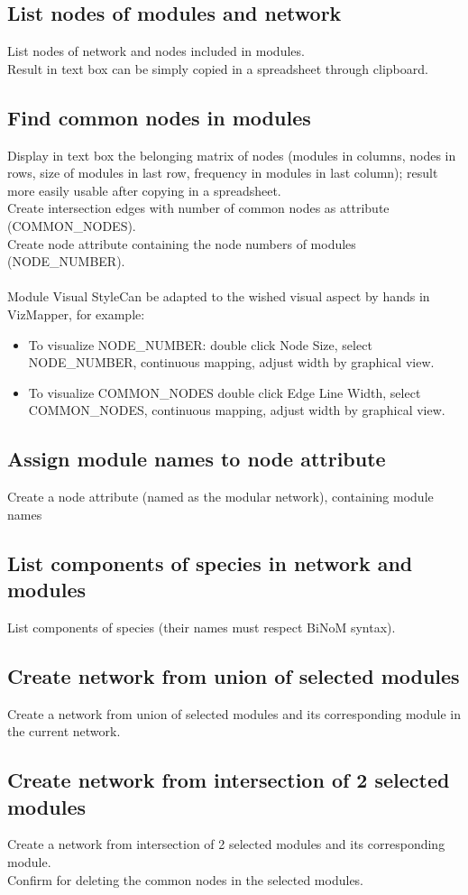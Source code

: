 \subsection{List nodes of modules and network}
List nodes of network and nodes included in modules.\\
Result in text box can be simply copied in a spreadsheet through clipboard.
\subsection{Find common nodes in modules}
Display in text box the belonging matrix of nodes (modules in columns, nodes in rows, size of modules in last row, frequency in modules in last column); result more easily usable after copying in a spreadsheet.\\
Create intersection edges with number of common nodes as attribute (COMMON\_NODES).\\
Create node attribute containing the node numbers of modules (NODE\_NUMBER).\\\\
Module Visual StyleCan be adapted to the wished visual aspect by hands in VizMapper, for example:
\begin{itemize}
\item To visualize NODE\_NUMBER: double click Node Size, select NODE\_NUMBER, continuous mapping, adjust width by graphical view.
\item To visualize COMMON\_NODES double click Edge Line Width, select COMMON\_NODES, continuous mapping, adjust width by graphical view.
\end{itemize}
\subsection{Assign module names to node attribute}
Create a node attribute (named as the modular network), containing module names 
\subsection{List components of species in network and modules}
List components of species (their names must respect BiNoM syntax).
\subsection{Create network from union of selected modules}
Create a network from union of selected modules and its corresponding module in the current network.
\subsection{Create network from intersection of 2 selected modules}
Create a network from intersection of 2 selected modules and its corresponding module.\\
Confirm for deleting the common nodes in the selected modules.
